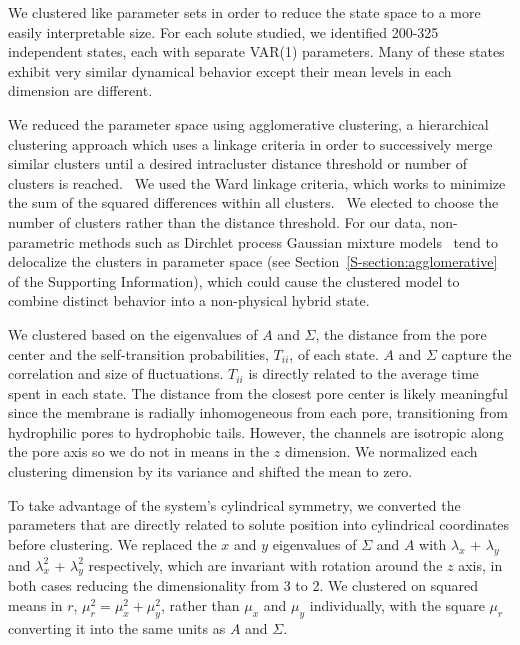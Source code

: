 \documentclass[journal=jpcbfk,manuscript=article]{achemso}
\begin{document}
  We clustered like parameter sets in order to reduce the state space to
  a more easily interpretable size. For each solute studied, we identified 200-325
  independent states, each with separate VAR(1) parameters. Many of these states
  exhibit very similar dynamical behavior except their mean levels in each dimension
  are different.
  
  We reduced the parameter space using agglomerative clustering, a hierarchical
  clustering approach which uses a linkage criteria in order to successively merge
  similar clusters until a desired intracluster distance threshold or number of
  clusters is reached.~\cite{pedregosa_scikit-learn_2011} We used the Ward linkage 
  criteria, which works to minimize the sum of the squared differences within all
  clusters.~\cite{ward_hierarchical_1963} We elected to choose the number of clusters
  rather than the distance threshold. For our data, non-parametric methods such as 
  Dirchlet process Gaussian mixture models~\cite{pedregosa_scikit-learn_2011,gelman_bayesian_2013}
  tend to delocalize the clusters in parameter space (see Section~\ref{S-section:agglomerative}
  of the Supporting Information), which could cause the clustered model to combine 
  distinct behavior into a non-physical hybrid state.

  We clustered based on the eigenvalues of $A$ and $\Sigma$, the distance from the 
  pore center and the self-transition probabilities, $T_{ii}$, of each state. $A$ 
  and $\Sigma$ capture the correlation and size of fluctuations. $T_{ii}$ is directly
  related to the average time spent in each state. The distance from the closest pore 
  center is likely meaningful since the membrane is radially inhomogeneous from each 
  pore, transitioning from hydrophilic pores to hydrophobic tails. However, the 
  channels are isotropic along the pore axis so we do not in means in the $z$ dimension.
  We normalized each clustering dimension by its variance and shifted the mean to zero.
  
  To take advantage of the system's cylindrical symmetry, we converted the parameters that
  are directly related to solute position into cylindrical coordinates before clustering. 
  We replaced the $x$ and $y$ eigenvalues of $\Sigma$ and $A$ with $\lambda_x$ + 
  $\lambda_y$ and $\lambda_x^2$ + $\lambda_y^2$ respectively, which are invariant with 
  rotation around the $z$ axis, in both cases reducing the dimensionality from 3 to 2.  
  We clustered on squared means in $r$, $\mu_r^2 = \mu_x^2 + \mu_y^2$, rather than
  $\mu_x$ and $\mu_y$ individually, with the square $\mu_r$ converting it into the 
  same units as $A$ and $\Sigma$.
\end{document}
